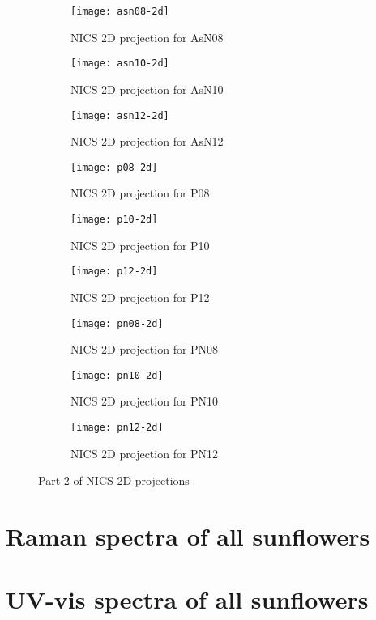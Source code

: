 \begin{figure*}[h]
\centering
\begin{subfigure}{5.5cm}\centering\texttt{[image: asn08-2d]}\caption{NICS 2D projection for AsN08}\end{subfigure}%
\begin{subfigure}{5.5cm}\centering\texttt{[image: asn10-2d]}\caption{NICS 2D projection for AsN10}\end{subfigure}%
\begin{subfigure}{5.5cm}\centering\texttt{[image: asn12-2d]}\caption{NICS 2D projection for AsN12}\end{subfigure}
\begin{subfigure}{5.5cm}\centering\texttt{[image: p08-2d]}\caption{NICS 2D projection for P08}\end{subfigure}%
\begin{subfigure}{5.5cm}\centering\texttt{[image: p10-2d]}\caption{NICS 2D projection for P10}\end{subfigure}%
\begin{subfigure}{5.5cm}\centering\texttt{[image: p12-2d]}\caption{NICS 2D projection for P12}\end{subfigure}
\begin{subfigure}{5.5cm}\centering\texttt{[image: pn08-2d]}\caption{NICS 2D projection for PN08}\end{subfigure}%
\begin{subfigure}{5.5cm}\centering\texttt{[image: pn10-2d]}\caption{NICS 2D projection for PN10}\end{subfigure}%
\begin{subfigure}{5.5cm}\centering\texttt{[image: pn12-2d]}\caption{NICS 2D projection for PN12}\end{subfigure}
\caption[Part 2 of NICS 2D projections]{Part 2 of NICS 2D projections}
\end{figure*}


\newpage
\section{Raman spectra of all sunflowers}


\newpage
\section{UV-vis spectra of all sunflowers}

